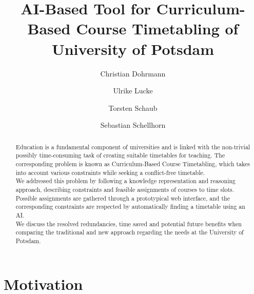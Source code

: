 \documentclass{easychair}
\title{AI-Based Tool for Curriculum-Based Course Timetabling of University of Potsdam}
\author{
Christian Dohrmann 
\and
Ulrike Lucke 
\and
Torsten Schaub 
\and 
Sebastian Schellhorn 
}
\institute{
  University of Potsdam,
  Germany\\
  \email{\{christian.dohrmann, ulrike.lucke, torsten.schaub, sebastian.schellhorn\}@uni-potsdam.de}
 }
\begin{document}
\maketitle

\begin{abstract}
    Education is a fundamental component of universities and is linked with the non-trivial possibly time-consuming task of creating suitable timetables for teaching. 
    The corresponding problem is known as Curriculum-Based Course Timetabling, which takes into account various constraints while seeking a conflict-free timetable. \\
    We addressed this problem by following a knowledge representation and reasoning approach, describing constraints and feasible assignments of courses to time slots. 
    Possible assignments are gathered through a prototypical web interface, and the corresponding constraints are respected by automatically finding a timetable using an AI. \\
    We discuss the resolved redundancies, time saved and potential future benefits when comparing the traditional and new approach regarding the needs at the University of Potsdam. 
\end{abstract}



%
%

\section{Motivation}
\label{sec:motivation}
\end{document}
